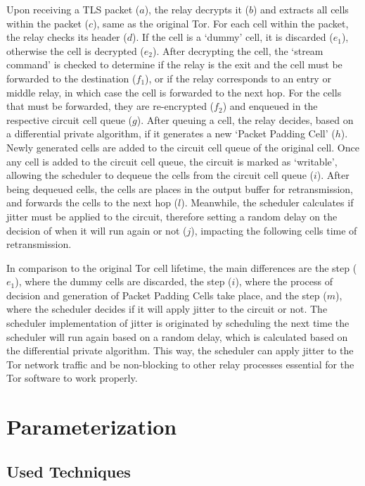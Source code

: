 Upon receiving a TLS packet (\(a\)), the relay decrypts it (\(b\)) and extracts all cells within the packet (\(c\)), same as the original Tor. For each cell within the packet, the relay checks its header (\(d\)). If the cell is a `dummy' cell, it is discarded (\(e_1\)), otherwise the cell is decrypted (\(e_2\)). After decrypting the cell, the `stream command' is checked to determine if the relay is the exit and the cell must be forwarded to the destination (\(f_1\)), or if the relay corresponds to an entry or middle relay, in which case the cell is forwarded to the next hop. For the cells that must be forwarded, they are re-encrypted (\(f_2\)) and enqueued in the respective circuit cell queue (\(g\)). After queuing a cell, the relay decides, based on a differential private algorithm, if it generates a new `Packet Padding Cell' (\(h\)). Newly generated cells are added to the circuit cell queue of the original cell. Once any cell is added to the circuit cell queue, the circuit is marked as `writable', allowing the scheduler to dequeue the cells from the circuit cell queue (\(i\)). After being dequeued cells, the cells are places in the output buffer for retransmission, and forwards the cells to the next hop (\(l\)). Meanwhile, the scheduler calculates if jitter must be applied to the circuit, therefore setting a random delay on the decision of when it will run again or not (\(j\)), impacting the following cells time of retransmission. 

In comparison to the original Tor cell lifetime, the main differences are the step (\(e_1\)), where the dummy cells are discarded, the step (\(i\)), where the process of decision and generation of  Packet Padding Cells take place, and the step (\(m\)), where the scheduler decides if it will apply jitter to the circuit or not. The scheduler implementation of jitter is originated by scheduling the next time the scheduler will run again based on a random delay, which is calculated based on the differential private algorithm. This way, the scheduler can apply jitter to the Tor network traffic and be non-blocking to other relay processes essential for the Tor software to work properly. 

\section{Parameterization}\label{sec:parameterization}

\subsection{Used Techniques}\label{sec:used_techniques}

